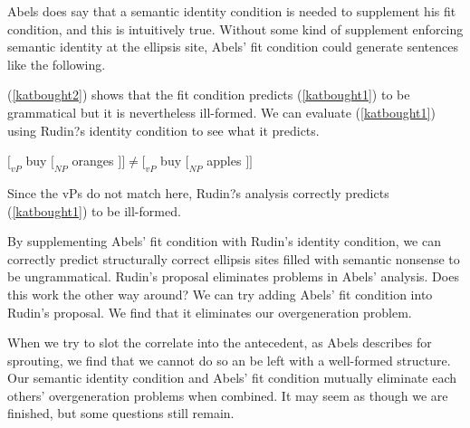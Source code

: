\documentclass{turabian-researchpaper}
\begin{document}
Abels does say that a semantic identity condition is needed to supplement his fit condition, and this is intuitively true. Without some kind of supplement enforcing semantic identity at the ellipsis site, Abels' fit condition could generate sentences like the following. 

\begin{exe}
\end{exe}

\begin{exe}
\end{exe}

(\ref{katbought2}) shows that the fit condition predicts (\ref{katbought1}) to be grammatical but it is nevertheless ill-formed. We can evaluate (\ref{katbought1}) using Rudin?s identity condition to see what it predicts. 

\begin{exe}
\ex\label{katbought3} $[_{vP}$ buy $[_{NP}$ oranges $]] \neq [_{vP}$ buy $[_{NP}$ apples $]]$ 
\end{exe}

Since the vPs do not match here, Rudin?s analysis correctly predicts (\ref{katbought1}) to be ill-formed. 

By supplementing Abels' fit condition with Rudin's identity condition, we can correctly predict structurally correct ellipsis sites filled with semantic nonsense to be ungrammatical. Rudin's proposal eliminates problems in Abels' analysis. Does this work the other way around? We can try adding Abels' fit condition into Rudin's proposal. We find that it eliminates our overgeneration problem. 

\begin{exe}
\end{exe}

\begin{exe}
\end{exe}

When we try to slot the correlate into the antecedent, as Abels describes for sprouting, we find that we cannot do so an be left with a well-formed structure. Our semantic identity condition and Abels' fit condition mutually eliminate each others' overgeneration problems when combined. It may seem as though we are finished, but some questions still remain.  
\end{document}
